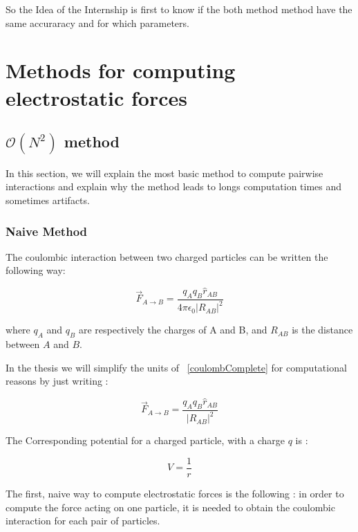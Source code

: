 \documentclass[12pt,twoside,a4paper]{report}
\begin{document}
So the Idea of the Internship is first to know if the both method method have the same accuraracy and for which parameters.


\chapter{Methods for computing electrostatic forces}


\section{$\mathcal{O}(N^2)$ method }


In this section, we will explain the most basic method to compute pairwise interactions and explain why the method leads to longs computation times and sometimes artifacts.

\subsection{Naive Method}

The coulombic interaction between two charged particles can be written the following way:

\begin{equation}
	\overrightarrow{F}_{A \rightarrow B} = \frac{q_A q_B \hat{r}_{AB} }{4\pi\epsilon_0|R_{AB}|^2}
	\label{coulombComplete}
\end{equation}

where $q_A $ and $q_B$ are respectively the charges of A and B, and $R_{AB}$ is the distance between $A$ and $B$.

In the thesis we will simplify the units of ~\eqref{coulombComplete} for computational reasons by just writing :

\begin{equation}
	\overrightarrow{F}_{A \rightarrow B} = \frac{q_A q_B \hat{r}_{AB} }{|R_{AB}|^2}
	\label{coulombSimplified}
\end{equation}

The Corresponding potential for a charged particle, with a charge $q$ is :

\begin{equation}
	V = \frac{1}{r}
	\label{potential}
\end{equation}



The first, naive way to compute electrostatic forces is the following : in order to compute the force acting on one particle, it is needed to obtain the coulombic interaction for each pair of particles.
\end{document}
